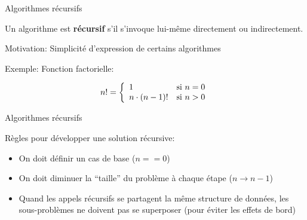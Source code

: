 \begin{frame}{Algorithmes récursifs}

Un algorithme est {\bf récursif} s'il s'invoque lui-même
directement ou indirectement.

\bigskip

Motivation: Simplicité d'expression de certains algorithmes

\bigskip

Exemple: Fonction factorielle:

\[n!=\left\{\begin{array}{ll}
1 &\mbox{si }n=0\\
n \cdot (n-1)! &\mbox{si }n>0$$
\end{array}
\right.
\]

\begin{center}
\end{center}

\end{frame}

\begin{frame}{Algorithmes récursifs}

\begin{center}
\end{center}

\bigskip

Règles pour développer une solution récursive:
\bigskip
\begin{itemize}
\item On doit définir un cas de base ($n==0$)
\item On doit diminuer la ``taille'' du problème à chaque étape ($n\rightarrow n-1$)
\item Quand les appels récursifs se partagent la même structure de données, les sous-problèmes ne doivent pas se superposer (pour éviter les effets de bord)
\end{itemize}
\end{frame}

